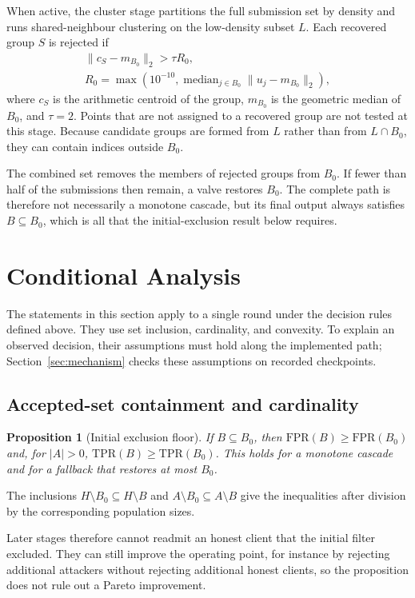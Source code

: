 \documentclass[journal]{IEEEtran}
\newtheorem{proposition}{Proposition}
\begin{document}
When active, the cluster stage partitions the full submission set by density and runs shared-neighbour clustering on the low-density subset $L$. Each recovered group $S$ is rejected if
\begin{equation}
\begin{gathered}
\|c_S-m_{B_0}\|_2>\tau R_0,\\
R_0=\max\!\left(10^{-10},\operatorname{median}_{j\in B_0}\|u_j-m_{B_0}\|_2\right),
\end{gathered}
\label{eq:consensus}
\end{equation}
where $c_S$ is the arithmetic centroid of the group, $m_{B_0}$ is the geometric median of $B_0$, and $\tau=2$. Points that are not assigned to a recovered group are not tested at this stage. Because candidate groups are formed from $L$ rather than from $L\cap B_0$, they can contain indices outside $B_0$.

The combined set removes the members of rejected groups from $B_0$. If fewer than half of the submissions then remain, a valve restores $B_0$. The complete path is therefore not necessarily a monotone cascade, but its final output always satisfies $B\subseteq B_0$, which is all that the initial-exclusion result below requires.

\section{Conditional Analysis}\label{sec:theory}
The statements in this section apply to a single round under the decision rules defined above. They use set inclusion, cardinality, and convexity. To explain an observed decision, their assumptions must hold along the implemented path; Section~\ref{sec:mechanism} checks these assumptions on recorded checkpoints.

\subsection{Accepted-set containment and cardinality}
\begin{proposition}[Initial exclusion floor]\label{prop:floor}
If $B\subseteq B_0$, then $\mathrm{FPR}(B)\geq\mathrm{FPR}(B_0)$ and, for $|A|>0$, $\mathrm{TPR}(B)\geq\mathrm{TPR}(B_0)$. This holds for a monotone cascade and for a fallback that restores at most $B_0$.
\end{proposition}
\begin{IEEEproof}
The inclusions $H\setminus B_0\subseteq H\setminus B$ and $A\setminus B_0\subseteq A\setminus B$ give the inequalities after division by the corresponding population sizes.
\end{IEEEproof}
Later stages therefore cannot readmit an honest client that the initial filter excluded. They can still improve the operating point, for instance by rejecting additional attackers without rejecting additional honest clients, so the proposition does not rule out a Pareto improvement.
\end{document}
